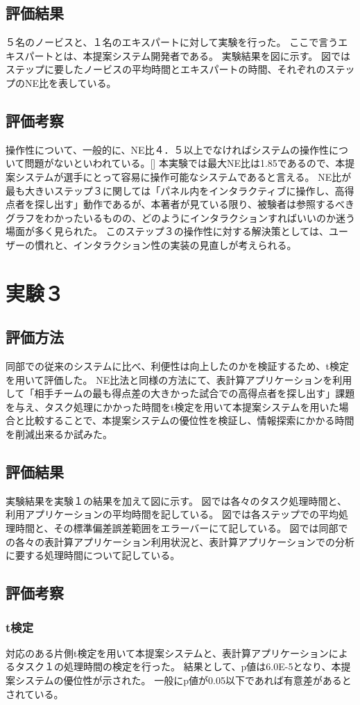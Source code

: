 \documentclass[sotsuron]{kuee}
\begin{document}
\subsection{評価結果}
５名のノービスと、１名のエキスパートに対して実験を行った。
ここで言うエキスパートとは、本提案システム開発者である。
実験結果を図に示す。
図ではステップに要したノービスの平均時間とエキスパートの時間、それぞれのステップのNE比を表している。
\subsection{評価考察}
操作性について、一般的に、NE比４．５以上でなければシステムの操作性について問題がないといわれている。[]
本実験では最大NE比は1.85であるので、本提案システムが選手にとって容易に操作可能なシステムであると言える。
NE比が最も大きいステップ３に関しては「パネル内をインタラクティブに操作し、高得点者を探し出す」動作であるが、本著者が見ている限り、被験者は参照するべきグラフをわかったいるものの、どのようにインタラクションすればいいのか迷う場面が多く見られた。
このステップ３の操作性に対する解決策としては、ユーザーの慣れと、インタラクション性の実装の見直しが考えられる。
\section{実験３}
\subsection{評価方法}
同部での従来のシステムに比べ、利便性は向上したのかを検証するため、t検定を用いて評価した。
NE比法と同様の方法にて、表計算アプリケーションを利用して「相手チームの最も得点差の大きかった試合での高得点者を探し出す」課題を与え、タスク処理にかかった時間をt検定を用いて本提案システムを用いた場合と比較することで、本提案システムの優位性を検証し、情報探索にかかる時間を削減出来るか試みた。
\subsection{評価結果}
実験結果を実験１の結果を加えて図に示す。
図では各々のタスク処理時間と、利用アプリケーションの平均時間を記している。
図では各ステップでの平均処理時間と、その標準偏差誤差範囲をエラーバーにて記している。
図では同部での各々の表計算アプリケーション利用状況と、表計算アプリケーションでの分析に要する処理時間について記している。
\subsection{評価考察}
\subsubsection{t検定}
対応のある片側t検定を用いて本提案システムと、表計算アプリケーションによるタスク１の処理時間の検定を行った。
結果として、p値は6.0E-5となり、本提案システムの優位性が示された。
一般にp値が0.05以下であれば有意差があるとされている。
\end{document}
